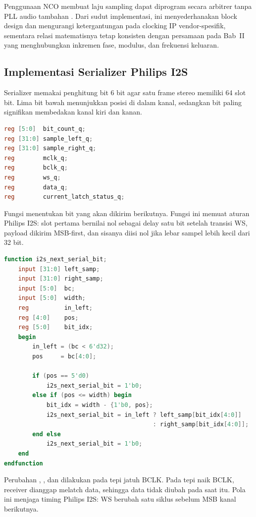 Penggunaan NCO membuat laju sampling dapat diprogram secara arbitrer tanpa PLL audio tambahan \citep{ao2012nco}. Dari sudut implementasi, ini menyederhanakan block design dan mengurangi ketergantungan pada clocking IP vendor-spesifik, sementara relasi matematisnya tetap konsisten dengan persamaan pada Bab~II yang menghubungkan inkremen fase, modulus, dan frekuensi keluaran.

\subsection{Implementasi Serializer Philips I2S}

Serializer memakai penghitung bit 6 bit agar satu frame stereo memiliki 64 slot bit. Lima bit bawah menunjukkan posisi di dalam kanal, sedangkan bit paling signifikan membedakan kanal kiri dan kanan.

\begin{lstlisting}[language=Verilog,caption={Register state utama serializer I2S.},label={lst:ch4-serializer-state}]
reg [5:0]  bit_count_q;
reg [31:0] sample_left_q;
reg [31:0] sample_right_q;
reg        mclk_q;
reg        bclk_q;
reg        ws_q;
reg        data_q;
reg        current_latch_status_q;
\end{lstlisting}

Fungsi  menentukan bit yang akan dikirim berikutnya. Fungsi ini memuat aturan Philips I2S: slot pertama bernilai nol sebagai delay satu bit setelah transisi WS, payload dikirim MSB-first, dan sisanya diisi nol jika lebar sampel lebih kecil dari 32 bit.

\begin{lstlisting}[language=Verilog,caption={Fungsi pembentuk bit serial Philips I2S.},label={lst:ch4-next-bit}]
function i2s_next_serial_bit;
    input [31:0] left_samp;
    input [31:0] right_samp;
    input [5:0]  bc;
    input [5:0]  width;
    reg          in_left;
    reg [4:0]    pos;
    reg [5:0]    bit_idx;
    begin
        in_left = (bc < 6'd32);
        pos     = bc[4:0];

        if (pos == 5'd0)
            i2s_next_serial_bit = 1'b0;
        else if (pos <= width) begin
            bit_idx = width - {1'b0, pos};
            i2s_next_serial_bit = in_left ? left_samp[bit_idx[4:0]]
                                          : right_samp[bit_idx[4:0]];
        end else
            i2s_next_serial_bit = 1'b0;
    end
endfunction
\end{lstlisting}

Perubahan , , dan  dilakukan pada tepi jatuh BCLK. Pada tepi naik BCLK, receiver dianggap melatch data, sehingga data tidak diubah pada saat itu. Pola ini menjaga timing Philips I2S: WS berubah satu siklus sebelum MSB kanal berikutnya.

